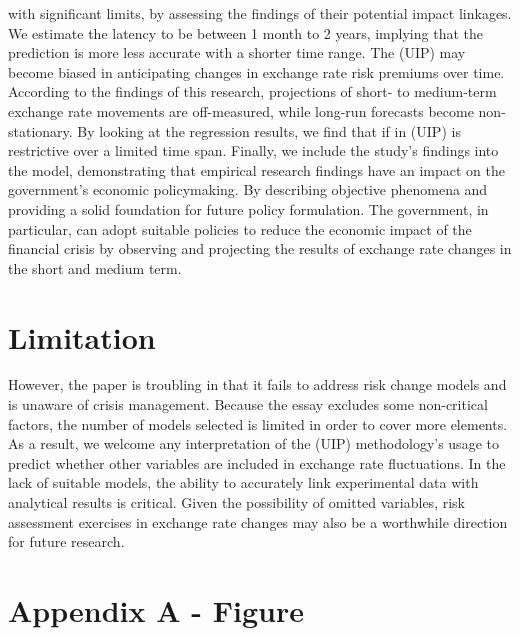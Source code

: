\documentclass[10pt]{article}
\begin{document}
with significant limits, by assessing the findings of their potential impact linkages. We estimate the latency to be between 1 month to 2 years, implying that the prediction is more less accurate with a shorter time range. The (UIP) may become biased in anticipating changes in exchange rate risk premiums over time. According to the findings of this research, projections of short- to medium-term exchange rate movements are off-measured, while long-run forecasts become non-stationary. By looking at the regression results, we find that if in (UIP) is restrictive over a limited time span. Finally, we include the study's findings into the model, demonstrating that empirical research findings have an impact on the government's economic policymaking. By describing objective phenomena and providing a solid foundation for future policy formulation. The government, in particular, can adopt suitable policies to reduce the economic impact of the financial crisis by observing and projecting the results of exchange rate changes in the short and medium term.


\section{Limitation}
However, the paper is troubling in that it fails to address risk change models and is unaware of crisis management. Because the essay excludes some non-critical factors, the number of models selected is limited in order to cover more elements. As a result, we welcome any interpretation of the (UIP) methodology's usage to predict whether other variables are included in exchange rate fluctuations. In the lack of suitable models, the ability to accurately link experimental data with analytical results is critical. Given the possibility of omitted variables, risk assessment exercises in exchange rate changes may also be a worthwhile direction for future research.





\printbibliography

\newpage

\appendix

\section{Appendix A - Figure}
\begin{lstlisting}[language=R]

\end{lstlisting}
\end{document}
